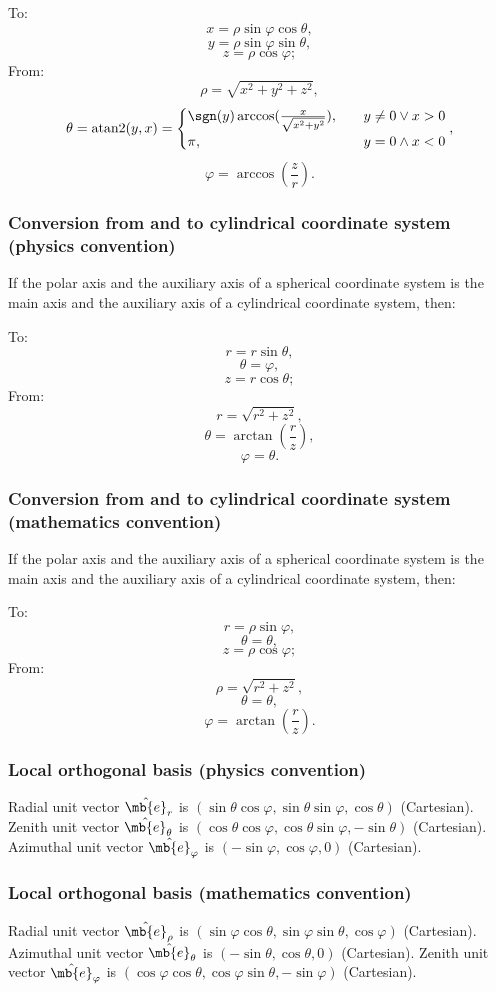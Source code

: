 \documentclass[a4paper,12pt]{report}
\begin{document}
\begin{itemize}
\begin{itemize}
To:
\[x=\rho\sin\varphi\cos\theta,\]
\[y=\rho\sin\varphi\sin\theta,\]
\[z=\rho\cos\varphi;\]
From:
\[\rho=\sqrt{x^2+y^2+z^2},\]
\[\theta=\operatorname{atan2}(y,x)=\begin{cases}\sgn(y)\arccos(\frac{x}{\sqrt{x^2+y^2}}),\quad&y\neq 0\lor x>0\\\pi,\quad&y=0\land x<0\end{cases},\]
\[\varphi=\arccos(\frac{z}{r}).\]
\subsubsection{Conversion from and to cylindrical coordinate system (physics convention)}
If the polar axis and the auxiliary axis of a spherical coordinate system is the main axis and the auxiliary axis of a cylindrical coordinate system, then:

To:
\[r=r\sin\theta,\]
\[\theta=\varphi,\]
\[z=r\cos\theta;\]
From:
\[r=\sqrt{r^2+z^2},\]
\[\theta=\arctan(\frac{r}{z}),\]
\[\varphi=\theta.\]
\subsubsection{Conversion from and to cylindrical coordinate system (mathematics convention)}
If the polar axis and the auxiliary axis of a spherical coordinate system is the main axis and the auxiliary axis of a cylindrical coordinate system, then:

To:
\[r=\rho\sin\varphi,\]
\[\theta=\theta,\]
\[z=\rho\cos\varphi;\]
From:
\[\rho=\sqrt{r^2+z^2},\]
\[\theta=\theta,\]
\[\varphi=\arctan(\frac{r}{z}).\]
\subsubsection{Local orthogonal basis (physics convention)}
Radial unit vector $\hat{\mb{e}}_r$ is $(\sin\theta\cos\varphi,\sin\theta\sin\varphi,\cos\theta)$ (Cartesian). Zenith unit vector $\hat{\mb{e}}_{\theta}$ is $(\cos\theta\cos\varphi,\cos\theta\sin\varphi,-\sin\theta)$ (Cartesian). Azimuthal unit vector $\hat{\mb{e}}_{\varphi}$ is $(-\sin\varphi,\cos\varphi,0)$ (Cartesian).
\subsubsection{Local orthogonal basis (mathematics convention)}
Radial unit vector $\hat{\mb{e}}_{\rho}$ is $(\sin\varphi\cos\theta,\sin\varphi\sin\theta,\cos\varphi)$ (Cartesian). Azimuthal unit vector $\hat{\mb{e}}_{\theta}$ is $(-\sin\theta,\cos\theta,0)$ (Cartesian). Zenith unit vector $\hat{\mb{e}}_{\varphi}$ is $(\cos\varphi\cos\theta,\cos\varphi\sin\theta,-\sin\varphi)$ (Cartesian).

\end{itemize}
\end{itemize}
\end{document}
